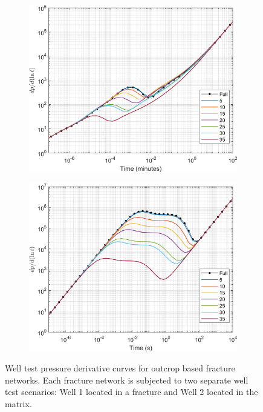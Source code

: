 \documentclass[Supplementary.tex]{subfiles}
\begin{document}
\begin{figure}[ht]
\begin{subfigure}{0.285\textwidth}
        \label{fig:Apodi4}
     \end{subfigure}
     \begin{subfigure}{0.35\textwidth}
        \includegraphics[width=\textwidth]{Apodi_DD/Apodi4_frac_nohead.png}
        \label{fig:Apodi4_DD_frac}
     \end{subfigure}
     \begin{subfigure}{0.35\textwidth}
        \includegraphics[width=\textwidth]{Apodi_DD/Apodi4_mat_nohead.png}
        \label{fig:Apodi4_DD_mat}
     \end{subfigure}
     \caption{Well test pressure derivative curves for outcrop based fracture networks. Each fracture network is subjected to two separate well test scenarios: Well 1 located in a fracture and Well 2 located in the matrix.}
     \label{fig:Apodi_DD}
 \end{figure}
\end{document}
